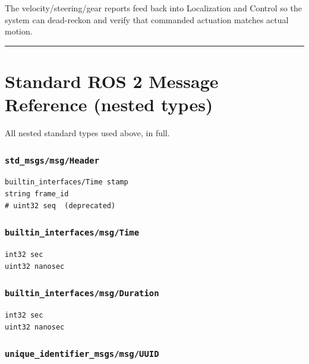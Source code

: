 \documentclass[
]{article}
\begin{document}
The velocity/steering/gear reports feed back into Localization and
Control so the system can dead-reckon and verify that commanded
actuation matches actual motion.

\begin{center}\rule{0.5\linewidth}{0.5pt}\end{center}

\section{Standard ROS 2 Message Reference (nested
types)}\label{standard-ros-2-message-reference-nested-types}

All nested standard types used above, in full.

\subsubsection{\texorpdfstring{\texttt{std\_msgs/msg/Header}}{std\_msgs/msg/Header}}\label{std_msgsmsgheader}

\begin{verbatim}
builtin_interfaces/Time stamp
string frame_id
# uint32 seq  (deprecated)
\end{verbatim}

\subsubsection{\texorpdfstring{\texttt{builtin\_interfaces/msg/Time}}{builtin\_interfaces/msg/Time}}\label{builtin_interfacesmsgtime}

\begin{verbatim}
int32 sec
uint32 nanosec
\end{verbatim}

\subsubsection{\texorpdfstring{\texttt{builtin\_interfaces/msg/Duration}}{builtin\_interfaces/msg/Duration}}\label{builtin_interfacesmsgduration}

\begin{verbatim}
int32 sec
uint32 nanosec
\end{verbatim}

\subsubsection{\texorpdfstring{\texttt{unique\_identifier\_msgs/msg/UUID}}{unique\_identifier\_msgs/msg/UUID}}\label{unique_identifier_msgsmsguuid}
\end{document}
